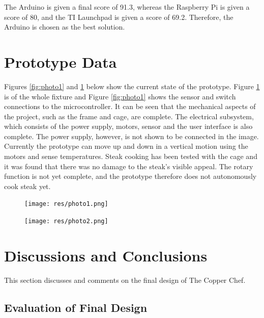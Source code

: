 \documentclass[11pt]{article}
\begin{document}
The Arduino is given a final score of 91.3, whereas the Raspberry Pi is given a score of 80, and the TI Launchpad is given a score of 69.2.
Therefore, the Arduino is chosen as the best solution.

\section{Prototype Data}

Figures \ref{fig:photo1} and \ref{fig:photo2} below show the current state of the prototype. Figure \ref{fig:photo2} is of the whole fixture and Figure \ref{fig:photo1} shows the sensor and switch connections to the microcontroller. It can be seen that the mechanical aspects of the project, such as the frame and cage, are complete. The electrical subsystem, which consists of the power supply, motors, sensor and the user interface is also complete. The power supply, however, is not shown to be connected in the image. Currently the prototype can move up and down in a vertical motion using the motors and sense temperatures. Steak cooking has been tested with the cage and it was found that there was no damage to the steak’s visible appeal. The rotary function is not yet complete, and the prototype therefore does not autonomously cook steak yet.

\begin{figure}[H]
\centering
\begin{minipage}{.5\textwidth}
  \centering
  \texttt{[image: res/photo1.png]}
  \label{fig:photo1}
\end{minipage}%
\begin{minipage}{.5\textwidth}
  \centering
  \texttt{[image: res/photo2.png]}
  \label{fig:photo2}
\end{minipage}
\end{figure}

\section{Discussions and Conclusions}

This section discusses and comments on the final design of The Copper Chef.

\subsection{Evaluation of Final Design}
\end{document}
